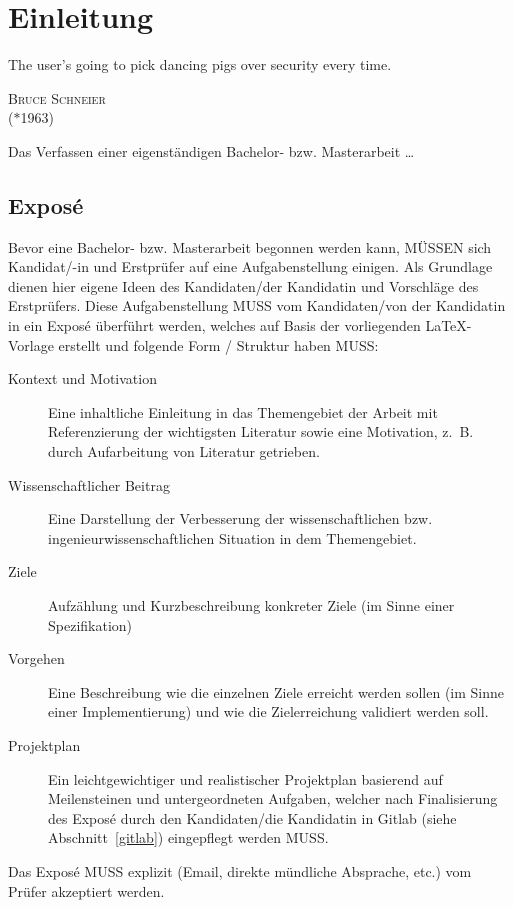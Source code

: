 \chapter{Einleitung}

\epigraph{\glqq The user's going to pick dancing pigs over security every time.\grqq\bigskip}
{\textsc{Bruce Schneier}\\ ($\ast$1963)}

\noindent
Das Verfassen einer eigenständigen Bachelor- bzw. Masterarbeit \dots
\indent

\section{Expos\'{e}}
\label{intro}

Bevor eine Bachelor- bzw. Masterarbeit begonnen werden kann, MÜSSEN sich Kan\-di\-dat/-in und Erstprüfer
auf eine Aufgabenstellung einigen. Als Grundlage dienen hier eigene Ideen des Kandidaten/der
Kandidatin und Vorschläge des Erstprüfers. Diese Aufgabenstellung MUSS vom Kandidaten/von der Kandidatin
in ein Expos\'{e} überführt werden, welches auf Basis der vorliegenden \LaTeX-Vorlage erstellt
und folgende Form / Struktur haben MUSS:

\begin{description}
 \item[Kontext und Motivation] Eine inhaltliche Einleitung in das Themengebiet der Arbeit
 mit Referenzierung der wichtigsten Literatur sowie eine Motivation, z.\, B. durch Aufarbeitung
 von Literatur getrieben.
 \item[Wissenschaftlicher Beitrag] Eine Darstellung der Verbesserung der wissenschaftlichen bzw.
 ingenieurwissenschaftlichen Situation in dem Themengebiet.
 \item[Ziele] Aufzählung und Kurzbeschreibung konkreter Ziele (im Sinne einer Spezifikation)
 \item[Vorgehen] Eine Beschreibung wie die einzelnen Ziele erreicht werden sollen (im Sinne einer Implementierung)
 und wie die Zielerreichung validiert werden soll.
 \item[Projektplan] Ein leichtgewichtiger und realistischer Projektplan basierend auf Meilensteinen
 und untergeordneten Aufgaben, welcher nach Finalisierung des Expos\'{e} durch den Kandidaten/die
 Kandidatin in Gitlab (siehe Abschnitt~\ref{gitlab}) eingepflegt werden MUSS.
\end{description}

Das Expos\'{e} MUSS explizit (Email, direkte mündliche Absprache, etc.) vom Prüfer akzeptiert werden.

